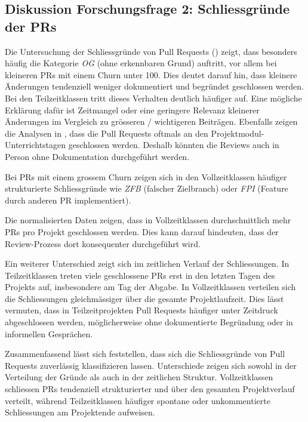 \subsection{Diskussion Forschungsfrage 2: Schliessgründe der PRs}
Die Untersuchung der Schliessgründe von Pull Requests () zeigt, dass besonders häufig die Kategorie \textit{OG} (ohne erkennbaren Grund) auftritt, vor allem bei kleineren PRs mit einem Churn unter 100. Dies deutet darauf hin, dass kleinere Änderungen tendenziell weniger dokumentiert und begründet geschlossen werden. \\
Bei den  Teilzeitklassen tritt dieses Verhalten deutlich häufiger auf. Eine mögliche Erklärung dafür ist Zeitmangel oder eine geringere Relevanz kleinerer Änderungen im Vergleich zu grösseren / wichtigeren Beiträgen. Ebenfalls zeigen die Analysen in , dass die Pull Requests oftmals an den Projektmodul-Unterrichtstagen geschlossen werden. Deshalb könnten die Reviews auch in Person ohne Dokumentation durchgeführt werden. 

Bei PRs mit einem grossem Churn zeigen sich in den Vollzeitklassen häufiger strukturierte Schliessgründe wie \textit{ZFB} (falscher Zielbranch) oder \textit{FPI} (Feature durch anderen PR implementiert).

Die normalisierten Daten zeigen, dass in Vollzeitklassen durchschnittlich mehr PRs pro Projekt geschlossen werden. Dies kann darauf hindeuten, dass der Review-Prozess dort konsequenter durchgeführt wird.

Ein weiterer Unterschied zeigt sich im zeitlichen Verlauf der Schliessungen. In Teilzeitklassen treten viele geschlossene PRs erst in den letzten Tagen des Projekts auf, insbesondere am Tag der Abgabe. In Vollzeitklassen verteilen sich die Schliessungen gleichmässiger über die gesamte Projektlaufzeit. Dies lässt vermuten, dass in Teilzeitprojekten Pull Requests häufiger unter Zeitdruck abgeschlossen werden, möglicherweise ohne dokumentierte Begründung oder in informellen Gesprächen.

Zusammenfassend lässt sich feststellen, dass sich die Schliessgründe von Pull Requests zuverlässig klassifizieren lassen. Unterschiede zeigen sich sowohl in der Verteilung der Gründe als auch in der zeitlichen Struktur. Vollzeitklassen schliessen PRs tendenziell strukturierter und über den gesamten Projektverlauf verteilt, während Teilzeitklassen häufiger spontane oder unkommentierte Schliessungen am Projektende aufweisen.


